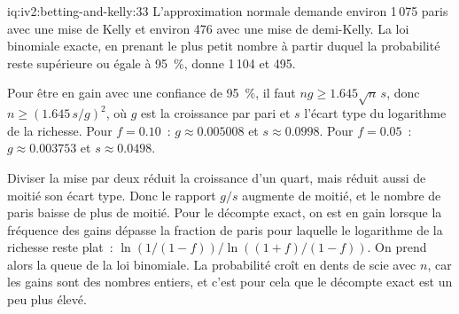 \begin{solution}{iq:iv2:betting-and-kelly:33}
L'approximation normale demande environ 1\,075 paris avec une mise de Kelly et environ 476 avec une mise de demi-Kelly. La loi binomiale exacte, en prenant le plus petit nombre à partir duquel la probabilité reste supérieure ou égale à 95~\%, donne 1\,104 et 495.

Pour être en gain avec une confiance de 95~\%, il faut $n g \geq 1.645\sqrt n\,s$, donc $n \geq (1.645\,s/g)^2$, où $g$ est la croissance par pari et $s$ l'écart type du logarithme de la richesse. Pour $f = 0.10$~: $g \approx 0.005008$ et $s \approx 0.0998$. Pour $f = 0.05$~: $g \approx 0.003753$ et $s \approx 0.0498$.

Diviser la mise par deux réduit la croissance d'un quart, mais réduit aussi de moitié son écart type. Donc le rapport $g/s$ augmente de moitié, et le nombre de paris baisse de plus de moitié. Pour le décompte exact, on est en gain lorsque la fréquence des gains dépasse la fraction de paris pour laquelle le logarithme de la richesse reste plat~: $\ln(1/(1 - f))/\ln((1 + f)/(1 - f))$. On prend alors la queue de la loi binomiale. La probabilité croît en dents de scie avec $n$, car les gains sont des nombres entiers, et c'est pour cela que le décompte exact est un peu plus élevé.

\end{solution}

